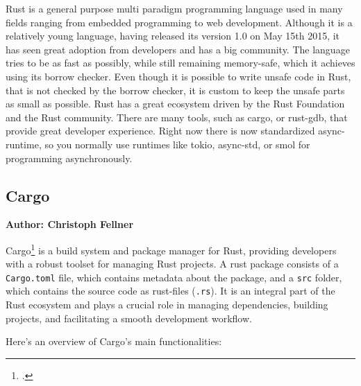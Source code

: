 Rust is a general purpose multi paradigm programming language used in many fields ranging from embedded programming to web development. Although it is a relatively young language, having released its version 1.0 on May 15th 2015, it has seen great adoption from developers and has a big community. The language tries to be as fast as possibly, while still remaining memory-safe, which it achieves using its borrow checker. Even though it is possible to write unsafe code in Rust, that is not checked by the borrow checker, it is custom to keep the unsafe parts as small as possible.
Rust has a great ecosystem driven by the Rust Foundation and the Rust community. There are many tools, such as cargo, or rust-gdb, that provide great developer experience.
Right now there is now standardized async-runtime, so you normally use runtimes like tokio, async-std, or smol for programming asynchronously.

\subsection{Cargo}
\textbf{Author: Christoph Fellner}

Cargo\footcite{cargo} is a build system and package manager for Rust, providing developers with a robust toolset for managing Rust projects. A rust package consists of a
\verb+Cargo.toml+ file, which contains metadata about the package, and a \verb+src+ folder, which contains the source code as rust-files (\verb+.rs+). It is an integral 
part of the Rust ecosystem and plays a crucial role in managing dependencies, building projects, and facilitating a smooth development workflow.

Here's an overview of Cargo's main functionalities:

